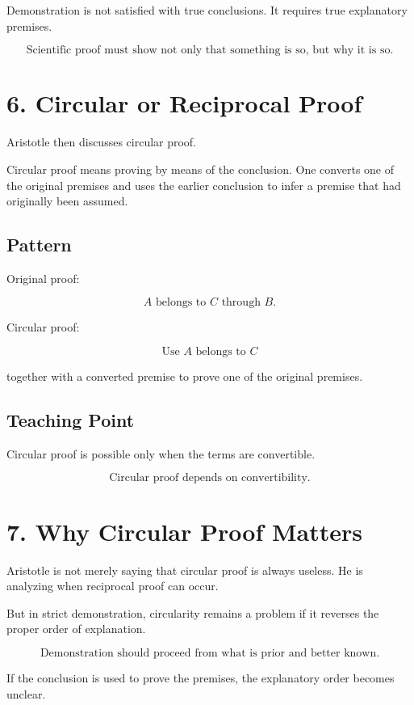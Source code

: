 \documentclass[12pt]{article}
\begin{document}
Demonstration is not satisfied with true conclusions. It requires true
explanatory premises.

\[
\boxed{
\text{Scientific proof must show not only that something is so, but why it is so.}
}
\]

\section*{6. Circular or Reciprocal Proof}

Aristotle then discusses circular proof.

Circular proof means proving by means of the conclusion. One converts one of
the original premises and uses the earlier conclusion to infer a premise that
had originally been assumed.

\subsection*{Pattern}

Original proof:

\[
A \text{ belongs to } C \text{ through } B.
\]

Circular proof:

\[
\text{Use } A \text{ belongs to } C
\]

together with a converted premise to prove one of the original premises.

\subsection*{Teaching Point}

Circular proof is possible only when the terms are convertible.

\[
\boxed{
\text{Circular proof depends on convertibility.}
}
\]

\section*{7. Why Circular Proof Matters}

Aristotle is not merely saying that circular proof is always useless. He is
analyzing when reciprocal proof can occur.

But in strict demonstration, circularity remains a problem if it reverses the
proper order of explanation.

\[
\text{Demonstration should proceed from what is prior and better known.}
\]

If the conclusion is used to prove the premises, the explanatory order becomes
unclear.
\end{document}
